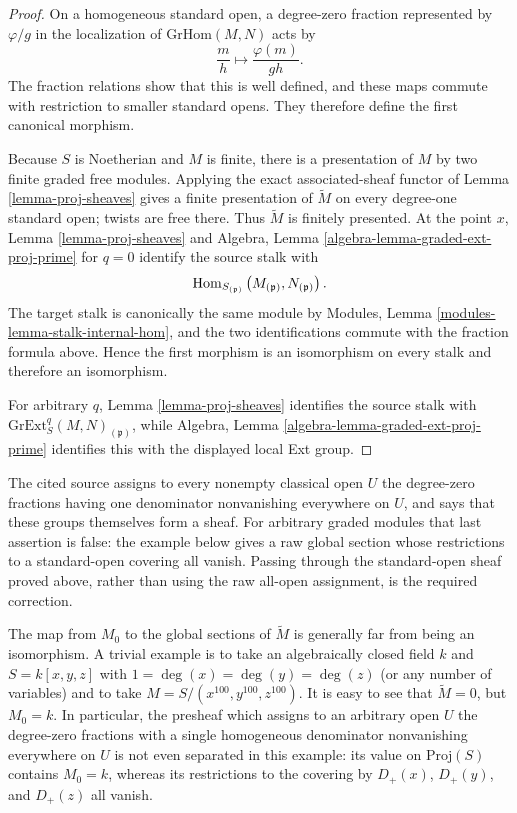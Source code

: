 \begin{proof}
On a homogeneous standard open, a degree-zero fraction represented by
$\varphi/g$ in the localization of $\text{GrHom}(M,N)$ acts by
$$
\frac{m}{h}\longmapsto\frac{\varphi(m)}{gh}.
$$
The fraction relations show that this is well defined, and these maps commute
with restriction to smaller standard opens. They therefore define the first
canonical morphism.

Because $S$ is Noetherian and $M$ is finite, there is a presentation of $M$
by two finite graded free modules. Applying the exact associated-sheaf
functor of Lemma \ref{lemma-proj-sheaves} gives a finite presentation of
$\widetilde M$ on every degree-one standard open; twists are free there.
Thus $\widetilde M$ is finitely presented. At the point $x$, Lemma
\ref{lemma-proj-sheaves} and Algebra, Lemma
\ref{algebra-lemma-graded-ext-proj-prime} for $q=0$ identify the source stalk
with
$$
\mathop{\mathrm{Hom}}\nolimits_{S_{(\mathfrak p)}}
\left(M_{(\mathfrak p)},N_{(\mathfrak p)}\right).
$$
The target stalk is canonically the same module by Modules, Lemma
\ref{modules-lemma-stalk-internal-hom}, and the two identifications commute
with the fraction formula above. Hence the first morphism is an isomorphism
on every stalk and therefore an isomorphism.

For arbitrary $q$, Lemma \ref{lemma-proj-sheaves} identifies the source
stalk with $\text{GrExt}^q_S(M,N)_{(\mathfrak p)}$, while Algebra, Lemma
\ref{algebra-lemma-graded-ext-proj-prime} identifies this with the displayed
local Ext group.
\end{proof}

\begin{remark}
\label{remark-global-sections-not-isomorphism}
\begin{reference}
\cite[Chapter III, \S 2, no. 57, pp. 249--250]{FAC}
\end{reference}
\begin{history}
The cited source assigns to every nonempty classical open $U$ the degree-zero
fractions having one denominator nonvanishing everywhere on $U$, and says
that these groups themselves form a sheaf. For arbitrary graded modules that
last assertion is false: the example below gives a raw global section whose
restrictions to a standard-open covering all vanish. Passing through the
standard-open sheaf proved above, rather than using the raw all-open
assignment, is the required correction.
\end{history}
The map from $M_0$ to the global sections of $\widetilde M$
is generally far from being an isomorphism. A trivial
example is to take an algebraically closed field $k$ and
$S = k[x, y, z]$ with $1 = \deg(x) = \deg(y) = \deg(z)$
(or any number of variables) and to take $M = S/(x^{100}, y^{100}, z^{100})$.
It is easy to see that $\widetilde M = 0$, but $M_0 = k$.
In particular, the presheaf which assigns to an arbitrary open $U$
the degree-zero fractions with a single homogeneous denominator
nonvanishing everywhere on $U$ is not even separated in this example:
its value on $\text{Proj}(S)$ contains $M_0 = k$, whereas its restrictions
to the covering by $D_{+}(x)$, $D_{+}(y)$, and $D_{+}(z)$ all vanish.
\end{remark}

